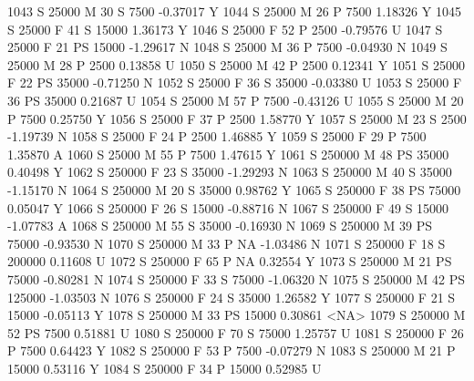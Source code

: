 \documentclass{article}
\begin{document}
\begin{Schunk}
\begin{Soutput}
1043      S      25000   M  30         S   7500  -0.37017    Y
1044      S      25000   M  26         P   7500   1.18326    Y
1045      S      25000   F  41         S  15000   1.36173    Y
1046      S      25000   F  52         P   2500  -0.79576    U
1047      S      25000   F  21        PS  15000  -1.29617    N
1048      S      25000   M  36         P   7500  -0.04930    N
1049      S      25000   M  28         P   2500   0.13858    U
1050      S      25000   M  42         P   2500   0.12341    Y
1051      S      25000   F  22        PS  35000  -0.71250    N
1052      S      25000   F  36         S  35000  -0.03380    U
1053      S      25000   F  36        PS  35000   0.21687    U
1054      S      25000   M  57         P   7500  -0.43126    U
1055      S      25000   M  20         P   7500   0.25750    Y
1056      S      25000   F  37         P   2500   1.58770    Y
1057      S      25000   M  23         S   2500  -1.19739    N
1058      S      25000   F  24         P   2500   1.46885    Y
1059      S      25000   F  29         P   7500   1.35870    A
1060      S      25000   M  55         P   7500   1.47615    Y
1061      S     250000   M  48        PS  35000   0.40498    Y
1062      S     250000   F  23         S  35000  -1.29293    N
1063      S     250000   M  40         S  35000  -1.15170    N
1064      S     250000   M  20         S  35000   0.98762    Y
1065      S     250000   F  38        PS  75000   0.05047    Y
1066      S     250000   F  26         S  15000  -0.88716    N
1067      S     250000   F  49         S  15000  -1.07783    A
1068      S     250000   M  55         S  35000  -0.16930    N
1069      S     250000   M  39        PS  75000  -0.93530    N
1070      S     250000   M  33         P     NA  -1.03486    N
1071      S     250000   F  18         S 200000   0.11608    U
1072      S     250000   F  65         P     NA   0.32554    Y
1073      S     250000   M  21        PS  75000  -0.80281    N
1074      S     250000   F  33         S  75000  -1.06320    N
1075      S     250000   M  42        PS 125000  -1.03503    N
1076      S     250000   F  24         S  35000   1.26582    Y
1077      S     250000   F  21         S  15000  -0.05113    Y
1078      S     250000   M  33        PS  15000   0.30861 <NA>
1079      S     250000   M  52        PS   7500   0.51881    U
1080      S     250000   F  70         S  75000   1.25757    U
1081      S     250000   F  26         P   7500   0.64423    Y
1082      S     250000   F  53         P   7500  -0.07279    N
1083      S     250000   M  21         P  15000   0.53116    Y
1084      S     250000   F  34         P  15000   0.52985    U

\end{Soutput}
\end{Schunk}
\end{document}
